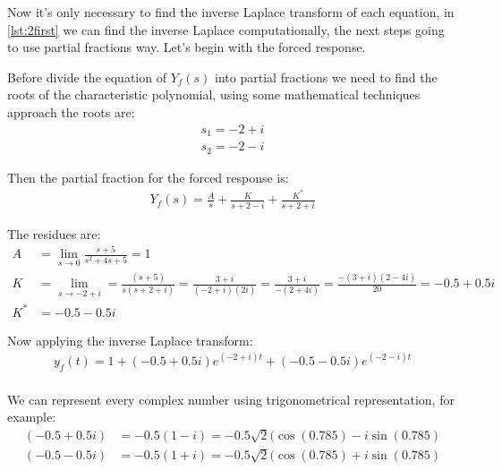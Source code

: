 \documentclass[a4paper,11pt]{article}
\begin{document}
\par Now it's only necessary to find the inverse Laplace transform of each equation, in \ref{lst:2first} we can find the inverse Laplace computationally, the next steps going to use partial fractions way. Let's begin with the forced response. 
\par Before divide the equation of $Y_f(s)$ into partial fractions we need to find the roots of the characteristic polynomial, using some mathematical techniques approach the roots are:
\begin{align*}
s_1 = -2+i\\
s_2 = -2-i
\end{align*}
\par Then the partial fraction for the forced response is:
\begin{align}
\label{eq:Eq13}
Y_f(s) = \frac{A}{s}+\frac{K}{s+2-i}+\frac{K^*}{s+2+i}
\end{align}
\par The residues are:
\begin{align*}
	A &= \lim_{s \rightarrow 0}\frac{s+5}{s^2+4s+5}=1\\
	K &= \lim_{s \rightarrow -2+i} = \frac{(s+5)}{s(s+2+i)} =\frac{3+i}{(-2+i)(2i)}=\frac{3+i}{-(2+4i)}=\frac{-(3+i)(2-4i)}{20}=-0.5+0.5i \\
	K^*&=-0.5-0.5i
\end{align*}
\par Now applying the inverse Laplace transform:
\begin{align*}
y_f(t) = 1+(-0.5+0.5i)e^{(-2+i)t}+(-0.5-0.5i)e^{(-2-i)t}\\
\end{align*}
\par We can represent every complex number using trigonometrical representation, for example:
\begin{align}
(-0.5+0.5i)&=-0.5(1-i)=-0.5\sqrt{2}(\cos(0.785)-i\sin(0.785)\\
(-0.5-0.5i)&=-0.5(1+i)=-0.5\sqrt{2}(\cos(0.785)+i\sin(0.785)
\end{align}
\end{document}
